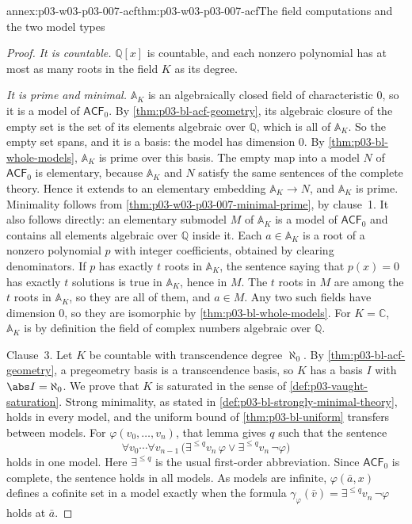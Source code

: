 \begin{annexitem}{annex:p03-w03-p03-007-acf}{thm:p03-w03-p03-007-acf}{The field computations and the two model types}
\begin{proof}
\emph{It is countable.} \(\mathbb Q[x]\) is countable, and each nonzero
polynomial has at most as many roots in the field \(K\) as its degree.

\emph{It is prime and minimal.} \(\mathbb A_K\) is an algebraically closed
field of characteristic \(0\), so it is a model of \(\mathsf{ACF}_0\). By
\cref{thm:p03-bl-acf-geometry}, its algebraic closure of the empty set is the
set of its elements algebraic over \(\mathbb Q\), which is all of
\(\mathbb A_K\). So the empty set spans, and it is a basis: the model has
dimension \(0\). By \cref{thm:p03-bl-whole-models}, \(\mathbb A_K\) is prime
over this basis. The empty map into a model \(N\) of \(\mathsf{ACF}_0\) is
elementary, because \(\mathbb A_K\) and \(N\) satisfy the same sentences of
the complete theory. Hence it extends to an elementary embedding
\(\mathbb A_K\to N\), and \(\mathbb A_K\) is prime. Minimality follows from
\cref{thm:p03-w03-p03-007-minimal-prime}, by clause~1. It also follows
directly: an elementary submodel \(M\) of \(\mathbb A_K\) is a model of
\(\mathsf{ACF}_0\) and contains all elements algebraic over \(\mathbb Q\)
inside it. Each \(a\in\mathbb A_K\) is a root of a nonzero polynomial \(p\)
with integer coefficients, obtained by clearing denominators. If \(p\) has
exactly \(t\) roots in \(\mathbb A_K\), the sentence saying that \(p(x)=0\)
has exactly \(t\) solutions is true in \(\mathbb A_K\), hence in \(M\). The
\(t\) roots in \(M\) are among the \(t\) roots in \(\mathbb A_K\), so they
are all of them, and \(a\in M\). Any two such fields have
dimension \(0\), so they are isomorphic by \cref{thm:p03-bl-whole-models}.
For \(K=\mathbb C\), \(\mathbb A_K\) is by definition the field of complex
numbers algebraic over \(\mathbb Q\).

Clause~3. Let \(K\) be countable with transcendence degree \(\aleph_0\). By
\cref{thm:p03-bl-acf-geometry}, a pregeometry basis is a transcendence basis,
so \(K\) has a basis \(I\) with \(\abs I=\aleph_0\). We prove that \(K\) is
saturated in the sense of \cref{def:p03-vaught-saturation}. Strong
minimality, as stated in \cref{def:p03-bl-strongly-minimal-theory}, holds in
every model, and the uniform bound of \cref{thm:p03-bl-uniform} transfers
between models. For \(\varphi(v_0,\ldots,v_n)\), that lemma gives \(q\) such
that the sentence
\[
 \forall v_0\cdots\forall v_{n-1}\,
 \bigl(\exists^{\le q}v_n\,\varphi\lor\exists^{\le q}v_n\,\neg\varphi\bigr)
\]
holds in one model. Here \(\exists^{\le q}\) is the usual first-order
abbreviation. Since \(\mathsf{ACF}_0\) is complete, the sentence holds in all
models. As models are infinite, \(\varphi(\bar a,x)\) defines a cofinite set
in a model exactly when the formula
\(\gamma_\varphi(\bar v)=\exists^{\le q}v_n\,\neg\varphi\) holds at \(\bar a\).


\end{proof}
\end{annexitem}
